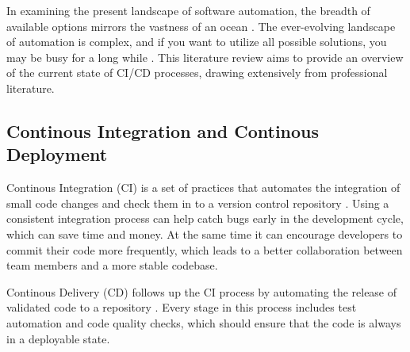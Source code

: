 

In examining the present landscape of software automation, the breadth of available options mirrors the vastness of an ocean \autocite{King2019}.
The ever-evolving landscape of automation is complex, and if you want to utilize all possible solutions, you may be busy for a long while \autocite{King2019}.
This literature review aims to provide an overview of the current state of CI/CD processes, drawing extensively from professional literature.

\subsection{Continous Integration and Continous Deployment}
Continous Integration (CI) is a set of practices that automates the integration of small code changes and check them in to a version control repository \autocite{infoworld}.
Using a consistent integration process can help catch bugs early in the development cycle, which can save time and money. 
At the same time it can encourage developers to commit their code more frequently, which leads to a better collaboration between team members and a more stable codebase.

Continous Delivery (CD) follows up the CI process by automating the release of validated code to a repository \autocite{redhat}.
Every stage in this process includes test automation and code quality checks, which should ensure that the code is always in a deployable state.

